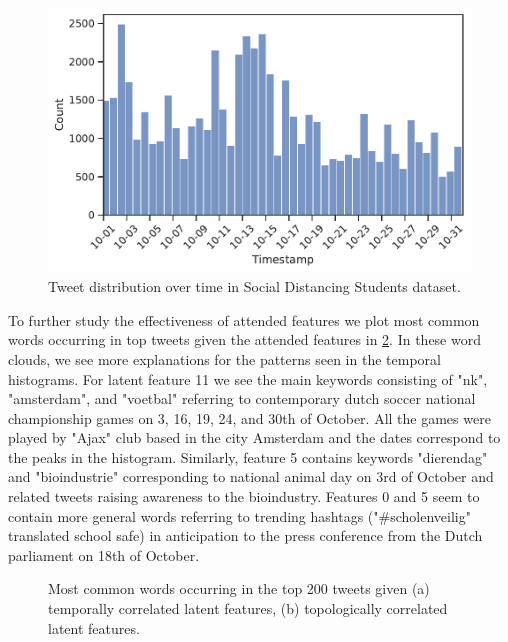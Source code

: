\begin{figure}[!ht]
\centering
\includegraphics[width=0.5\columnwidth]{resources/figs/case_study/01_timestamp_dist.pdf}
\caption{
    Tweet distribution over time in Social Distancing Students dataset.
}
\label{fig:cs_ts_dist}
\end{figure}

To further study the effectiveness of attended features we plot most common words occurring in top tweets given the attended features in \cref{fig:cs_feat_cloud}.
In these word clouds, we see more explanations for the patterns seen in the temporal histograms.
For latent feature 11 we see the main keywords consisting of "nk", "amsterdam", and "voetbal" referring to contemporary dutch soccer national championship games on 3, 16, 19, 24, and 30th of October.
All the games were played by "Ajax" club based in the city Amsterdam and the dates correspond to the peaks in the histogram.
Similarly, feature 5 contains keywords "dierendag" and "bioindustrie" corresponding to national animal day on 3rd of October and related tweets raising awareness to the bioindustry.
Features 0 and 5 seem to contain more general words referring to trending hashtags ("\#scholenveilig" translated school safe) in anticipation to the press conference from the Dutch parliament on 18th of October.

\begin{figure}[!ht]
\centering
{}\quad
{}\quad
\caption{
    Most common words occurring in the top 200 tweets given (a) temporally correlated latent features, (b) topologically correlated latent features.
}
\label{fig:cs_feat_cloud}
\end{figure}

